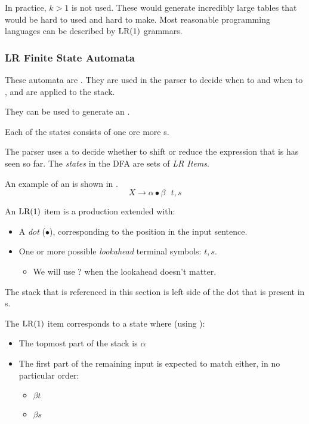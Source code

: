 In practice, $k>1$ is not used.
These would generate incredibly large tables that would be hard to used and hard to make.
Most reasonable programming languages can be described by $\operatorname{\text{LR}}(1)$ grammars.

\subsubsection{LR Finite State Automata}\label{subsubsec:LRFiniteStateAutomata}
These automata are .
They are used in the parser to decide when to  and when to , and are applied to the stack.

They can be used to generate an .

Each of the states consists of one ore more s.

\begin{definition}[LR Item]\label{def:LRItem}
  The parser uses a  to decide whether to shift or reduce the expression that is has seen so far.
  The \emph{states} in the DFA are sets of \emph{LR Items}.

  An example of an  is shown in .
  \begin{equation}\label{eq:LRItem}
    X \rightarrow \alpha \bullet \beta \:\:\: t,s
  \end{equation}

  An $\operatorname{\text{LR}}(1)$ item is a production extended with:
  \begin{itemize}[noitemsep]
  \item A \emph{dot}  ($\bullet$), corresponding to the position in the input sentence.
  \item One or more possible \emph{lookahead} terminal symbols: $t,s$.
    \begin{itemize}[noitemsep]
    \item We will use ? when the lookahead doesn't matter.
    \end{itemize}
  \end{itemize}

  \begin{remark}
    The stack that is referenced in this section is left side of the dot that is present in s.
  \end{remark}
  
  The $\operatorname{\text{LR}}(1)$ item corresponds to a state where (using ):
  \begin{itemize}[noitemsep]
  \item The topmost part of the stack is $\alpha$
  \item The first part of the remaining input is expected to match either, in no particular order:
    \begin{itemize}[noitemsep]
    \item $\beta t$
    \item $\beta s$
    \end{itemize}
  \end{itemize}
\end{definition}

